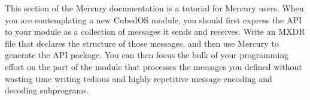 This section of the Mercury documentation is a tutorial for Mercury users. When you are
contemplating a new CubedOS module, you should first express the API to your module as a
collection of messages it sends and receives. Write an MXDR file that declares the structure of
those messages, and then use Mercury to generate the API package. You can then focus the bulk of
your programming effort on the part of the module that processes the messages you defined
without wasting time writing tedious and highly repetitive message encoding and decoding
subprograms.
